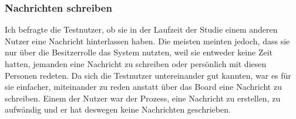 



\subsubsection{Nachrichten schreiben}\label{Nachrichten schreiben}
Ich befragte die Testnutzer, ob sie in der Laufzeit der Studie einem anderen Nutzer eine Nachricht hinterlassen haben.
Die meisten meinten jedoch, dass sie nur über die Besitzerrolle das System nutzten, weil sie entweder keine Zeit hatten, jemanden eine Nachricht zu schreiben oder persönlich mit diesen Personen redeten.
Da sich die Testnutzer untereinander gut kannten, war es für sie einfacher, miteinander zu reden anstatt über das Board eine Nachricht zu schreiben.
Einem der Nutzer war der Prozess, eine Nachricht zu erstellen, zu aufwändig und er hat deswegen keine Nachrichten geschrieben.
